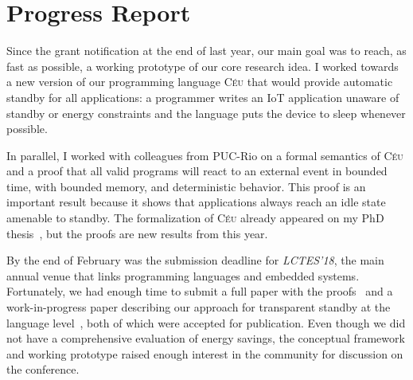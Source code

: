 \documentclass[12pt,english]{amsart}
\newcommand{\CEU}{\textsc{C\'{e}u}\xspace}
\begin{document}
\section{Progress Report}

Since the grant notification at the end of last year, our main goal was to
reach, as fast as possible, a working prototype of our core research idea.
%
I worked towards a new version of our programming language \CEU that would
provide automatic standby for all applications:
    a programmer writes an IoT application unaware of standby or energy
    constraints and the language puts the device to sleep whenever possible.

In parallel, I worked with colleagues from PUC-Rio on a formal semantics of
\CEU and a proof that all valid programs will react to an external event in
bounded time, with bounded memory, and deterministic behavior.
This proof is an important result because it shows that applications always
reach an idle state amenable to standby.
The formalization of \CEU already appeared on my PhD thesis~\cite{ceu.phd}, but
the proofs are new results from this year.

By the end of February was the submission deadline for \emph{LCTES'18}, the
main annual venue that links programming languages and embedded systems.
Fortunately, we had enough time to submit a full paper with the
proofs~\cite{ceu.lctes18} and a work-in-progress paper describing our approach
for transparent standby at the language level~\cite{ceu.lctes18.short}, both
of which were accepted for publication.
%
Even though we did not have a comprehensive evaluation of energy savings, the
conceptual framework and working prototype raised enough interest in the
community for discussion on the conference.
\end{document}
